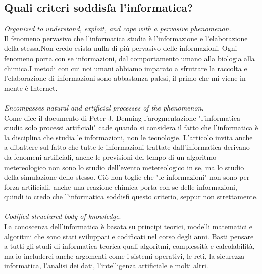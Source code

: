 \documentclass[a4paper]{article}
\begin{document}
\subsection{Quali criteri soddisfa l'informatica?}
\emph{Organized to understand, exploit, and cope with a pervasive phenomenon.}\\
Il fenomeno pervasivo che l'informatica studia è l'informazione e l'elaborazione della stessa.Non credo esista nulla di più pervasivo delle informazioni. Ogni fenomeno porta con se informazioni, dal comportamento umano alla biologia alla chimica.I metodi con cui noi umani abbiamo imparato a sfruttare la raccolta e l'elaborazione di informazioni sono abbastanza palesi, il primo che mi viene in mente è Internet.
\\\\

\emph{Encompasses natural and artificial processes of the phenomenon}.\\
Come dice il documento di Peter J. Denning\cite{isScience} l'arogmentazione "l'informatica studia solo processi artificiali" cade quando si considera il fatto che l'informatica è la disciplina che studia le informazioni, non le tecnologie. 
L'articolo \cite{isScience}invita anche a dibattere sul fatto che tutte le informazioni trattate dall'informatica derivano da fenomeni artificiali, anche le previsioni del tempo di un algoritmo metereologico non sono lo studio dell'evento metereologico in se, ma lo studio della simulazione dello stesso. Ciò non toglie che "le informazioni" non sono per forza artificiali, anche una reazione chimica porta con se delle informazioni, quindi io credo che l'informatica soddisfi questo criterio, seppur non strettamente.\\ \\

\emph{Codified structured body of knowledge}.\\La conoscenza dell'informatica è basata su principi teorici, modelli matematici e algoritmi che sono stati sviluppati e codificati nel corso degli anni. Basti pensare a tutti gli studi di informatica teorica quali algoritmi, complessità e calcolabilità, ma io includerei anche argomenti come i sistemi operativi, le reti, la sicurezza informatica, l'analisi dei dati, l'intelligenza artificiale e molti altri. \\\\
\end{document}
